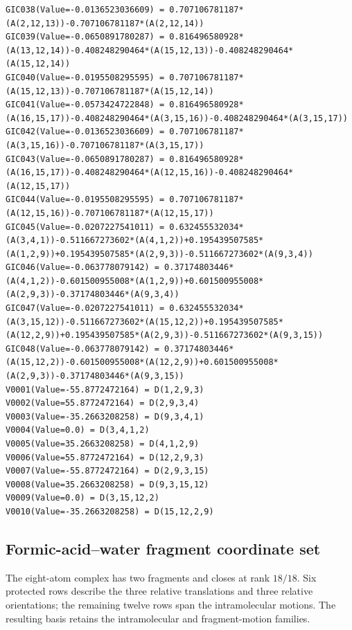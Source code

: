 \documentclass[10pt]{article}
\begin{document}
\begin{lstlisting}[basicstyle=\ttfamily\scriptsize,caption={Complete norbornane Gaussian ReadAllGIC input.}]
GIC038(Value=-0.0136523036609) = 0.707106781187*(A(2,12,13))-0.707106781187*(A(2,12,14))
GIC039(Value=-0.0650891780287) = 0.816496580928*(A(13,12,14))-0.408248290464*(A(15,12,13))-0.408248290464*(A(15,12,14))
GIC040(Value=-0.0195508295595) = 0.707106781187*(A(15,12,13))-0.707106781187*(A(15,12,14))
GIC041(Value=-0.0573424722848) = 0.816496580928*(A(16,15,17))-0.408248290464*(A(3,15,16))-0.408248290464*(A(3,15,17))
GIC042(Value=-0.0136523036609) = 0.707106781187*(A(3,15,16))-0.707106781187*(A(3,15,17))
GIC043(Value=-0.0650891780287) = 0.816496580928*(A(16,15,17))-0.408248290464*(A(12,15,16))-0.408248290464*(A(12,15,17))
GIC044(Value=-0.0195508295595) = 0.707106781187*(A(12,15,16))-0.707106781187*(A(12,15,17))
GIC045(Value=-0.0207227541011) = 0.632455532034*(A(3,4,1))-0.511667273602*(A(4,1,2))+0.195439507585*(A(1,2,9))+0.195439507585*(A(2,9,3))-0.511667273602*(A(9,3,4))
GIC046(Value=-0.063778079142) = 0.37174803446*(A(4,1,2))-0.601500955008*(A(1,2,9))+0.601500955008*(A(2,9,3))-0.37174803446*(A(9,3,4))
GIC047(Value=-0.0207227541011) = 0.632455532034*(A(3,15,12))-0.511667273602*(A(15,12,2))+0.195439507585*(A(12,2,9))+0.195439507585*(A(2,9,3))-0.511667273602*(A(9,3,15))
GIC048(Value=-0.063778079142) = 0.37174803446*(A(15,12,2))-0.601500955008*(A(12,2,9))+0.601500955008*(A(2,9,3))-0.37174803446*(A(9,3,15))
V0001(Value=-55.8772472164) = D(1,2,9,3)
V0002(Value=55.8772472164) = D(2,9,3,4)
V0003(Value=-35.2663208258) = D(9,3,4,1)
V0004(Value=0.0) = D(3,4,1,2)
V0005(Value=35.2663208258) = D(4,1,2,9)
V0006(Value=55.8772472164) = D(12,2,9,3)
V0007(Value=-55.8772472164) = D(2,9,3,15)
V0008(Value=35.2663208258) = D(9,3,15,12)
V0009(Value=0.0) = D(3,15,12,2)
V0010(Value=-35.2663208258) = D(15,12,2,9)
\end{lstlisting}

\subsection{Formic-acid--water fragment coordinate set}

The eight-atom complex has two fragments and closes at rank \(18/18\).  Six protected rows describe
the three relative translations and three relative orientations; the remaining
twelve rows span the intramolecular motions.  The resulting basis retains the intramolecular and fragment-motion families.
\end{document}
